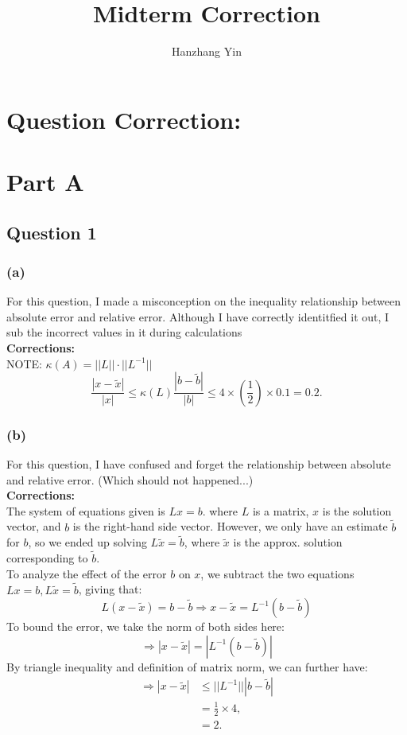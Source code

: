 \documentclass[12pt]{article}
\title{\vspace{-2cm}Midterm Correction}
\author{Hanzhang Yin}
\begin{document}
\maketitle

\section*{Question Correction: }

\section{Part A}

\subsection*{Question 1}

\subsubsection{(a)}
For this question, I made a misconception on the inequality relationship between absolute error and relative error. Although I have correctly identitfied it out,
I sub the incorrect values in it during calculations
\\
\textbf{Corrections: }
\\
NOTE: \(\kappa(A) = ||L|| \cdot ||L^{-1}|| \)
\[ 
    \frac{|x - \tilde{x}|}{|x|} \leq \kappa(L) \frac{|b - \tilde{b}|}{|b|} \leq 4 \times \left(\frac{1}{2}\right) \times 0.1 = 0.2.
\]
 
\subsubsection{(b)}
For this question, I have confused and forget the relationship between absolute and relative error. (Which should not happened...)
\\
\textbf{Corrections: }
\\
The system of equations given is $Lx = b$. where $L$ is a matrix, $x$ is the solution vector, and $b$ is the right-hand side vector.
However, we only have an estimate $\tilde{b}$ for $b$, so we ended up solving $L\tilde{x} = \tilde{b}$, where $\tilde{x}$ is the approx. solution corresponding to $\tilde{b}$.
\\
To analyze the effect of the error $b$ on $x$, we subtract the two equations $Lx = b, L\tilde{x} = \tilde{b}$, giving that:
\[ L(x - \tilde{x}) = b - \tilde{b} \Rightarrow x - \tilde{x} = L^{-1}(b - \tilde{b}) \]
To bound the error, we take the norm of both sides here:
\[ \Rightarrow |x - \tilde{x}| = |L^{-1}(b - \tilde{b})| \]
By triangle inequality and definition of matrix norm, we can further have:
\begin{align*}
\Rightarrow |x - \tilde{x}| &\leq ||L^{-1}|| |b - \tilde{b}| \\
    &= \frac{1}{2} \times 4, \\
    &= 2.
\end{align*}
\end{document}
